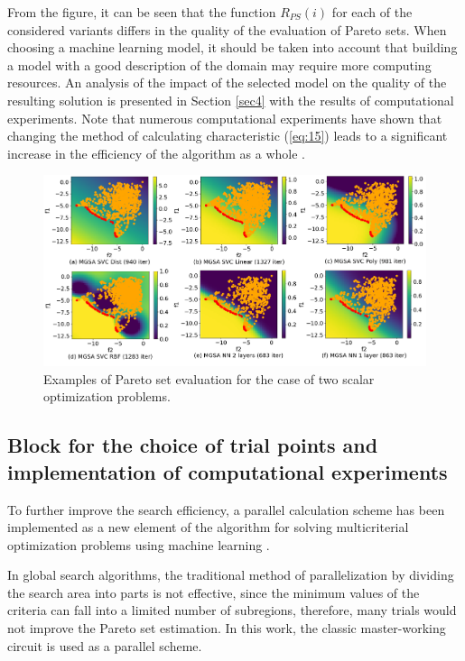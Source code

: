 \documentclass[runningheads]{llncs}
\begin{document}
From the figure, it can be seen that the function $R_{PS}(i)$ for each of the considered variants differs in the quality of the evaluation of Pareto sets. When choosing a machine learning model, it should be taken into account that building a model with a good description of the domain may require more computing resources. An analysis of the impact of the selected model on the quality of the resulting solution is presented in Section \ref{sec4} with the results of computational experiments. Note that numerous computational experiments have shown that changing the method of calculating characteristic (\ref{eq:15}) leads to a significant increase in the efficiency of the algorithm as a whole \cite{Konnov2025,MCO_ML_2023}.

\begin{figure}[t]
\center
\includegraphics[width=\textwidth]{fig4.png}
\caption{Examples of Pareto set evaluation for the case of two scalar optimization problems.} \label{fig4}
\end{figure}


\subsection{Block for the choice of trial points and implementation of computational experiments}
\label{subsec35}

To further improve the search efficiency, a parallel calculation scheme has been implemented as a new element of the algorithm for solving multicriterial optimization problems using machine learning \cite{ioptmco}. 

In global search algorithms, the traditional method of parallelization by dividing the search area into parts is not effective, since the minimum values of the criteria can fall into a limited number of subregions, therefore, many trials would not improve the Pareto set estimation. 
In this work, the classic master-working circuit is used as a parallel scheme. 
\end{document}
